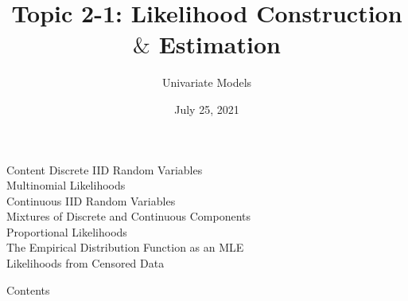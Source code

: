 \documentclass{beamer}
\title{Topic 2-1: Likelihood Construction $\&$ Estimation}
\subtitle{Univariate Models}
\author{}
\institute{EXST 7160 \\
Department of Experimental Statistics\\
 Louisiana State University}
\date{July 25, 2021}
\begin{document}
\frame{\titlepage}

\begin{frame}{Content}
    \vspace{1ex}
Discrete IID Random Variables\\
Multinomial Likelihoods\\
Continuous IID Random Variables\\
Mixtures of Discrete and Continuous Components\\
Proportional Likelihoods\\
The Empirical Distribution Function as an MLE\\
Likelihoods from Censored Data
\end{frame}

\begin{frame}{Contents}
    \tableofcontents[hidesubsections]
\end{frame}
\end{document}
